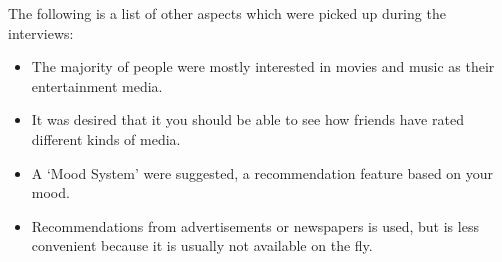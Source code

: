 The following is a list of other aspects which were picked up during the interviews:

\begin{itemize}
	\item The majority of people were mostly interested in movies and music as their entertainment media.
	\item It was desired that it you should be able to see how friends have rated different kinds of media.
	\item A ‘Mood System’ were suggested, a recommendation feature based on your mood.
	\item Recommendations from advertisements or newspapers is used, but is less convenient because it is usually not available on the fly.

\end{itemize}